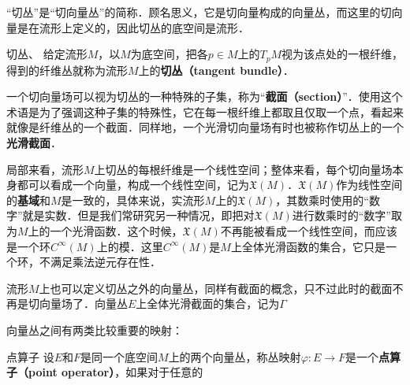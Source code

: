 \begin{issues}
\issueDraft
\end{issues}


“切丛”是“切向量丛”的简称．顾名思义，它是切向量构成的向量丛，而这里的切向量是在流形上定义的，因此切丛的底空间是流形．

\begin{definition}{切丛、}
给定流形$M$，以$M$为底空间，把各$p\in M$上的$T_pM$视为该点处的一根纤维，得到的纤维丛就称为流形$M$上的\textbf{切丛（tangent bundle）}．
\end{definition}

一个切向量场可以视为切丛的一种特殊的子集，称为“\textbf{截面（section）}”．使用这个术语是为了强调这种子集的特殊性，它在每一根纤维上都取且仅取一个点，看起来就像是纤维丛的一个截面．同样地，一个光滑切向量场有时也被称作切丛上的一个\textbf{光滑截面}．

局部来看，流形$M$上切丛的每根纤维是一个线性空间；整体来看，每个切向量场本身都可以看成一个向量，构成一个线性空间，记为$\mathfrak{X}(M)$．$\mathfrak{X}(M)$作为线性空间的\textbf{基域}和$M$是一致的，具体来说，实流形$M$上的$\mathfrak{X}(M)$，其数乘时使用的“数字”就是实数．但是我们常研究另一种情况，即把对$\mathfrak{X}(M)$进行数乘时的“数字”取为$M$上的一个光滑函数．这个时候，$\mathfrak{X}(M)$不再能被看成一个线性空间，而应该是一个环$C^\infty(M)$上的模．这里$C^\infty(M)$是$M$上全体光滑函数的集合，它只是一个环，不满足乘法逆元存在性．

流形$M$上也可以定义切丛之外的向量丛，同样有截面的概念，只不过此时的截面不再是切向量场了．向量丛$E$上全体光滑截面的集合，记为$\Gamma$

向量丛之间有两类比较重要的映射：

\begin{definition}{点算子}
设$E$和$F$是同一个底空间$M$上的两个向量丛，称丛映射$\varphi:E\rightarrow F$是一个\textbf{点算子（point operator）}，如果对于任意的
\end{definition}


